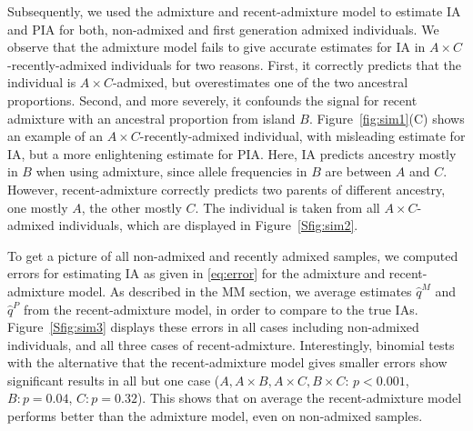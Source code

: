 \documentclass[12pt]{article}
\theoremstyle{definition}
\begin{document}
Subsequently, we used the admixture and recent-admixture model to estimate IA and PIA for both, non-admixed and first generation admixed individuals. We observe that the admixture model fails to give accurate estimates for IA in $A\times C$-recently-admixed individuals for two reasons. First, it correctly predicts that the individual is $A\times C$-admixed, but overestimates one of the two ancestral proportions. Second, and more severely, it confounds the signal for recent admixture with an ancestral proportion from island $B$. Figure~\ref{fig:sim1}(C) shows an example of an $A\times C$-recently-admixed individual, with misleading estimate for IA, but a more enlightening estimate for PIA. Here, IA predicts  ancestry mostly in $B$ when using admixture, since allele frequencies in $B$ are between $A$ and $C$.  However, recent-admixture correctly predicts two parents of different ancestry, one mostly $A$, the other mostly $C$. The individual is taken from all $A\times C$-admixed individuals, which are displayed in Figure~\ref{Sfig:sim2}.

To get a picture of all non-admixed and recently admixed samples, we computed errors for estimating IA as given in \eqref{eq:error} for the admixture and recent-admixture model. As described in the MM section, we average estimates $\hat q^M$ and $\hat q^P$ from the recent-admixture model, in order to compare to the true IAs. Figure~\ref{Sfig:sim3} displays these errors in all cases including non-admixed individuals, and all three cases of recent-admixture. Interestingly, binomial tests with the alternative that the recent-admixture model gives smaller errors show significant results in all but one case ($A, A\times B, A\times C, B\times C$: $p<0.001$, $B: p = 0.04$, $C: p=0.32$). This shows that on average the recent-admixture model performs better than the admixture model, even on non-admixed samples. 
\end{document}
